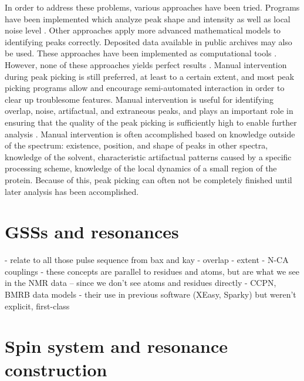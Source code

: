 In order to address these problems, various approaches have been tried.  
Programs have been implemented which analyze peak shape and intensity as 
well as local noise level \cite{munin, autopsy}.  Other approaches 
apply more advanced mathematical models to identifying peaks correctly.  
Deposited data available in public archives may also be used. 
These approaches have been implemented as computational tools 
\cite{williamson2009automated, guerry2011automated}.
However, none of these approaches yields perfect 
results \cite{guerry2011automated}.  Manual intervention during peak picking 
is still preferred, at least to a certain extent, and most peak picking 
programs allow and encourage semi-automated interaction in order to clear 
up troublesome features.  Manual intervention is useful for identifying 
overlap, noise, artifactual, and extraneous peaks, 
and plays an important role in ensuring that the quality of the peak picking 
is sufficiently high to enable further analysis \cite{guntert2009automated}.  
Manual intervention is often accomplished based on knowledge outside of the 
spectrum: existence, position, and shape of peaks in other spectra, knowledge 
of the solvent, characteristic artifactual patterns caused by a specific 
processing scheme, knowledge of the local dynamics of a small region of the 
protein.  \cite{williamson2009automated, guntert2009automated, 
altieri2004automation, baran2004automated}
Because of this, peak picking can often not be completely finished until 
later analysis has been accomplished.


\section{GSSs and resonances}
 - relate to all those pulse sequence from bax and kay
 - overlap
 - extent
 - N-CA couplings
 - these concepts are parallel to residues and atoms, but are what we see in the
   NMR data -- since we don't see atoms and residues directly
 - CCPN, BMRB data models
 - their use in previous software (XEasy, Sparky) but weren't explicit, first-class


\section{Spin system and resonance construction}

